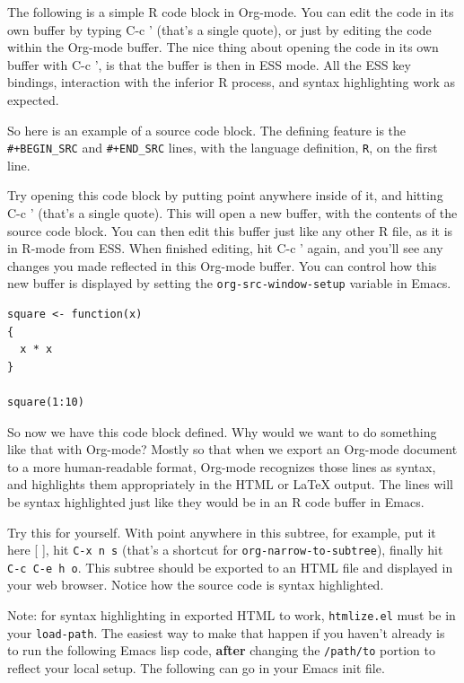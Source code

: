 \documentclass[11pt]{article}
\begin{document}
The following is a simple R code block in Org-mode. You can edit the code in its own buffer by typing C-c ' (that's a single quote), or just by editing the code within the Org-mode buffer. The nice thing about opening the code in its own buffer with C-c ', is that the buffer is then in ESS mode. All the ESS key bindings, interaction with the inferior R process, and syntax highlighting work as expected.

So here is an example of a source code block. The defining feature is the \texttt{\#+BEGIN\_SRC} and \texttt{\#+END\_SRC} lines, with the language definition, \texttt{R}, on the first line. 

Try opening this code block by putting point anywhere inside of it, and hitting C-c ' (that's a single quote). This will open a new buffer, with the contents of the source code block. You can then edit this buffer just like any other R file, as it is in R-mode from ESS. When finished editing, hit C-c ' again, and you'll see any changes you made reflected in this Org-mode buffer. You can control how this new buffer is displayed by setting the \texttt{org-src-window-setup} variable in Emacs.

\begin{verbatim}
square <- function(x) 
{
  x * x
}
  
square(1:10)
\end{verbatim}

So now we have this code block defined. Why would we want to do something like that with Org-mode? Mostly so that when we export an Org-mode document to a more human-readable format, Org-mode recognizes those lines as syntax, and highlights them appropriately in the HTML or \LaTeX{} output. The lines will be syntax highlighted just like they would be in an R code buffer in Emacs.

Try this for yourself. With point anywhere in this subtree, for example, put it here [ ], hit \texttt{C-x n s} (that's a shortcut for \texttt{org-narrow-to-subtree}), finally hit \texttt{C-c C-e h o}. This subtree should be exported to an HTML file and displayed in your web browser. Notice how the source code is syntax highlighted. 

Note: for syntax highlighting in exported HTML to work, \texttt{htmlize.el} must be in your \texttt{load-path}. The easiest way to make that happen if you haven't already is to run the following Emacs lisp code, \textbf{after} changing the \texttt{/path/to} portion to reflect your local setup. The following can go in your Emacs init file. 
\end{document}
